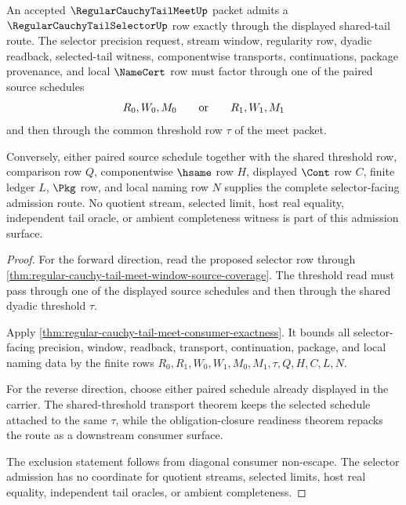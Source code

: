 \begin{theorem}
\label{thm:regular-cauchy-tail-meet-selector-admission}
An accepted $\RegularCauchyTailMeetUp$ packet admits a $\RegularCauchyTailSelectorUp$ row exactly through the displayed shared-tail route. The selector precision request, stream window, regularity row, dyadic readback, selected-tail witness, componentwise transports, continuations, package provenance, and local $\NameCert$ row must factor through one of the paired source schedules
$$
R_0,W_0,M_0
\qquad\hbox{or}\qquad
R_1,W_1,M_1
$$
and then through the common threshold row $\tau$ of the meet packet.

Conversely, either paired source schedule together with the shared threshold row, comparison row $Q$, componentwise $\hsame$ row $H$, displayed $\Cont$ row $C$, finite ledger $L$, $\Pkg$ row, and local naming row $N$ supplies the complete selector-facing admission route. No quotient stream, selected limit, host real equality, independent tail oracle, or ambient completeness witness is part of this admission surface.
\end{theorem}
\begin{proof}
For the forward direction, read the proposed selector row through \autoref{thm:regular-cauchy-tail-meet-window-source-coverage}. The threshold read must pass through one of the displayed source schedules and then through the shared dyadic threshold $\tau$.

Apply \autoref{thm:regular-cauchy-tail-meet-consumer-exactness}. It bounds all selector-facing precision, window, readback, transport, continuation, package, and local naming data by the finite rows $R_0,R_1,W_0,W_1,M_0,M_1,\tau,Q,H,C,L,N$.

For the reverse direction, choose either paired schedule already displayed in the carrier. The shared-threshold transport theorem keeps the selected schedule attached to the same $\tau$, while the obligation-closure readiness theorem repacks the route as a downstream consumer surface.

The exclusion statement follows from diagonal consumer non-escape. The selector admission has no coordinate for quotient streams, selected limits, host real equality, independent tail oracles, or ambient completeness.
\end{proof}

